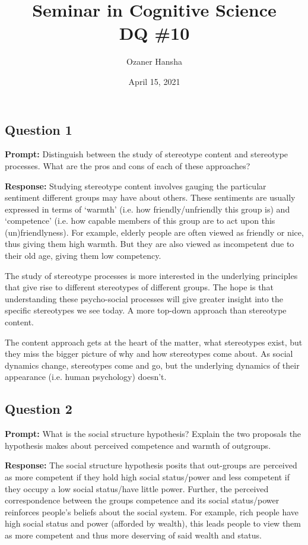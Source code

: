 \documentclass{article}
\begin{document}
\title{Seminar in Cognitive Science\\ DQ \#10}
\author{Ozaner Hansha}
\date{April 15, 2021}
\maketitle

\subsection*{Question 1}
\noindent\textbf{Prompt:} Distinguish between the study of stereotype content and stereotype processes. What are the pros and cons of each of these approaches?
\bigskip

\noindent\textbf{Response:} Studying stereotype content involves gauging the particular sentiment different groups may have about others. These sentiments are usually expressed in terms of `warmth' (i.e. how friendly/unfriendly this group is) and `competence' (i.e. how capable members of this group are to act upon this (un)friendlyness). For example, elderly people are often viewed as friendly or nice, thus giving them high warmth. But they are also viewed as incompetent due to their old age, giving them low competency.

The study of stereotype processes is more interested in the underlying principles that give rise to different stereotypes of different groups. The hope is that understanding these psycho-social processes will give greater insight into the specific stereotypes we see today. A more top-down approach than stereotype content.

The content approach gets at the heart of the matter, what stereotypes exist, but they miss the bigger picture of why and how stereotypes come about. As social dynamics change, stereotypes come and go, but the underlying dynamics of their appearance (i.e. human psychology) doesn't.

\subsection*{Question 2}
\noindent\textbf{Prompt:} What is the social structure hypothesis? Explain the two proposals the hypothesis makes about perceived competence and warmth of outgroups.
\bigskip

\noindent\textbf{Response:} The social structure hypothesis posits that out-groups are perceived as more competent if they hold high social status/power and less competent if they occupy a low social status/have little power. Further, the perceived correspondence between the groups competence and its social status/power reinforces people's beliefs about the social system. For example, rich people have high social status and power (afforded by wealth), this leads people to view them as more competent and thus more deserving of said wealth and status.
\end{document}
